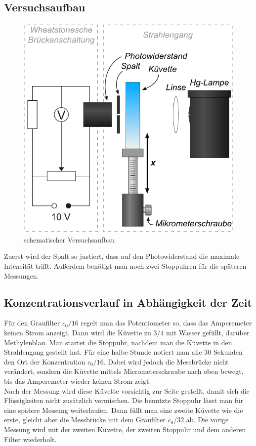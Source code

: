 \documentclass[12pt,a4paper,titlepage,headinclude,bibtotoc]{scrartcl}
\begin{document}
\subsection{Versuchsaufbau}
\begin{figure}[!htb]
	\centering	
	\includegraphics[scale=0.7]{Aufbau_schematisch.png}
	\caption{schematischer Versuchsaufbau \cite{lp}}
\end{figure}
Zuerst wird der Spalt so justiert, dass auf den Photowiderstand die maximale Intensität trifft.
Außerdem benötigt man noch zwei Stoppuhren für die späteren Messungen.
\subsection{Konzentrationsverlauf in Abhängigkeit der Zeit}
Für den Graufilter $c_0/16$ regelt man das Potentiometer so, dass das Amperemeter keinen Strom anzeigt.
Dann wird die Küvette zu $3/4$ mit Wasser gefüllt, darüber Methylenblau.
Man startet die Stoppuhr, nachdem man die Küvette in den Strahlengang gestellt hat.
Für eine halbe Stunde notiert man alle 30 Sekunden den Ort der Konzentration $c_0/16$.
Dabei wird jedoch die Messbrücke nicht verändert, sondern die Küvette mittels Micrometerschraube nach oben bewegt, bis das Amperemeter wieder keinen Strom zeigt.\\
Nach der Messung wird diese Küvette vorsichtig zur Seite gestellt, damit sich die Flüssigkeiten nicht zusätzlich vermischen.
Die benutzte Stoppuhr lässt man für eine spätere Messung weiterlaufen.
Dann füllt man eine zweite Küvette wie die erste, gleicht aber die Messbrücke mit dem Graufilter $c_0/32$ ab.
Die vorige Messung wird mit der zweiten Küvette, der zweiten Stoppuhr und dem anderen Filter wiederholt.
\end{document}
